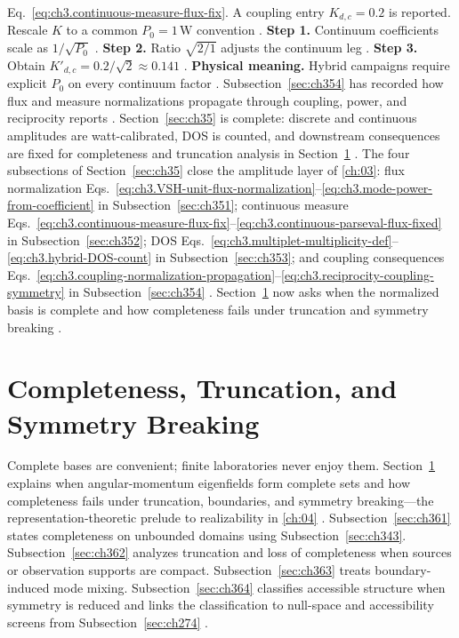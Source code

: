 Eq.~\eqref{eq:ch3.continuous-measure-flux-fix}. A coupling entry \(K_{d,c}=0.2\) is reported. Rescale \(K\) to a common
\(P_{0}=1\,\mathrm{W}\) convention \cite{harrington2001}.
\textbf{Step 1.} Continuum coefficients scale as \(1/\sqrt{P_{0}}\) \cite{hansen1988}.
\textbf{Step 2.} Ratio \(\sqrt{2/1}\) adjusts the continuum leg \cite{harrington2001}.
\textbf{Step 3.} Obtain \(K'_{d,c}=0.2/\sqrt{2}\approx0.141\) \cite{stratton1941}.
\textbf{Physical meaning.} Hybrid campaigns require explicit \(P_{0}\) on every continuum factor \cite{poynting1884}.
Subsection~\ref{sec:ch354} has recorded how flux and measure normalizations propagate through coupling, power, and
reciprocity reports \cite{stratton1941}. Section~\ref{sec:ch35} is complete: discrete and
continuous amplitudes are watt-calibrated, DOS is counted, and downstream consequences are fixed for completeness and
truncation analysis in Section~\ref{sec:ch36} \cite{hansen1988}.
The four subsections of Section~\ref{sec:ch35} close the amplitude layer of \ref{ch:03}: flux normalization
Eqs.~\eqref{eq:ch3.VSH-unit-flux-normalization}--\eqref{eq:ch3.mode-power-from-coefficient} in Subsection~\ref{sec:ch351};
continuous measure Eqs.~\eqref{eq:ch3.continuous-measure-flux-fix}--\eqref{eq:ch3.continuous-parseval-flux-fixed} in
Subsection~\ref{sec:ch352}; DOS Eqs.~\eqref{eq:ch3.multiplet-multiplicity-def}--\eqref{eq:ch3.hybrid-DOS-count} in
Subsection~\ref{sec:ch353}; and coupling consequences Eqs.~\eqref{eq:ch3.coupling-normalization-propagation}--\eqref{eq:ch3.reciprocity-coupling-symmetry}
in Subsection~\ref{sec:ch354} \cite{stratton1941}. Section~\ref{sec:ch36} now asks when the
normalized basis is complete and how completeness fails under truncation and symmetry breaking \cite{harrington2001}.
\section{Completeness, Truncation, and Symmetry Breaking}
\label{sec:ch36}
Complete bases are convenient; finite laboratories never enjoy them. Section~\ref{sec:ch36} explains when
angular-momentum eigenfields form complete sets and how completeness fails under truncation, boundaries, and
symmetry breaking---the representation-theoretic prelude to realizability in \ref{ch:04}
\cite{harrington2001}. Subsection~\ref{sec:ch361} states completeness on unbounded domains using
Subsection~\ref{sec:ch343}. Subsection~\ref{sec:ch362} analyzes truncation and loss of completeness when
sources or observation supports are compact. Subsection~\ref{sec:ch363} treats boundary-induced mode mixing.
Subsection~\ref{sec:ch364} classifies accessible structure when symmetry is reduced and links the classification to
null-space and accessibility screens from Subsection~\ref{sec:ch274} \cite{devaney2004}.
